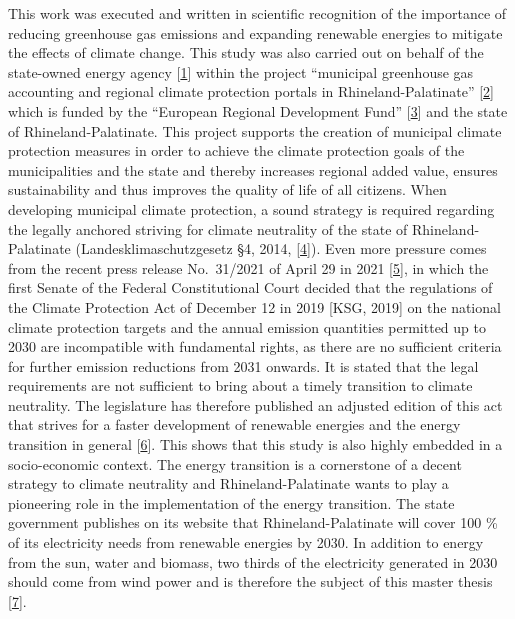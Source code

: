 \documentclass[a4paper,11pt]{article}
\begin{document}
This work was executed and written in scientific recognition of the importance of reducing greenhouse gas emissions and expanding renewable energies to mitigate the effects of climate change.
This study was also carried out on behalf of the state-owned energy agency {[}\protect\hyperlink{ref-EnergieagenturRheinlandPfalz.2021}{1}{]} within the project ``municipal greenhouse gas accounting and regional climate protection portals in Rhineland-Palatinate'' {[}\protect\hyperlink{ref-KomBiReK.2021}{2}{]} which is funded by the ``European Regional Development Fund'' {[}\protect\hyperlink{ref-EuropeanRegionalDevelopmentFund.2021}{3}{]} and the state of Rhineland-Palatinate. This project supports the creation of municipal climate protection measures in order to achieve the climate protection goals of the municipalities and the state and thereby increases regional added value, ensures sustainability and thus improves the quality of life of all citizens. When developing municipal climate protection, a sound strategy is required regarding the legally anchored striving for climate neutrality of the state of Rhineland-Palatinate (Landesklimaschutzgesetz §4, 2014, {[}\protect\hyperlink{ref-RheinlandPfalz.19.08.2014}{4}{]}). Even more pressure comes from the recent press release No.~31/2021 of April 29 in 2021 {[}\protect\hyperlink{ref-Bundesverfassungsgericht.24.03.2021}{5}{]}, in which the first Senate of the Federal Constitutional Court decided that the regulations of the Climate Protection Act of December 12 in 2019 {[}KSG, 2019{]} on the national climate protection targets and the annual emission quantities permitted up to 2030 are incompatible with fundamental rights, as there are no sufficient criteria for further emission reductions from 2031 onwards. It is stated that the legal requirements are not sufficient to bring about a timely transition to climate neutrality. The legislature has therefore published an adjusted edition of this act that strives for a faster development of renewable energies and the energy transition in general {[}\protect\hyperlink{ref-BundesministeriumfurUmweltNaturschutzundnukleareSicherheit.12.05.2021}{6}{]}. This shows that this study is also highly embedded in a socio-economic context.
The energy transition is a cornerstone of a decent strategy to climate neutrality and Rhineland-Palatinate wants to play a pioneering role in the implementation of the energy transition. The state government publishes on its website that Rhineland-Palatinate will cover 100 \% of its electricity needs from renewable energies by 2030. In addition to energy from the sun, water and biomass, two thirds of the electricity generated in 2030 should come from wind power and is therefore the subject of this master thesis {[}\protect\hyperlink{ref-LandesregierungRheinlandPfalz.2021}{7}{]}.
\end{document}
